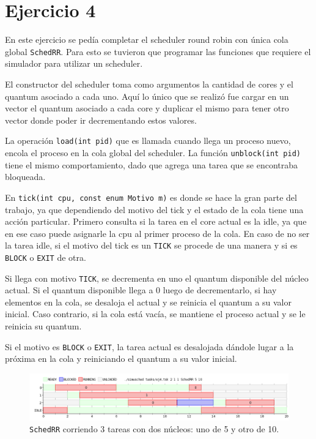 \section{Ejercicio 4}

En este ejercicio se pedía completar el scheduler round robin con única cola
global \texttt{SchedRR}. Para esto se tuvieron que programar las funciones que
requiere el simulador para utilizar un scheduler.

El constructor del scheduler toma como argumentos la cantidad de cores y el
quantum asociado a cada uno. Aquí lo único que se realizó fue cargar en un
vector el quantum asociado a cada core y duplicar el mismo para tener otro
vector donde poder ir decrementando estos valores.

La operación \texttt{load(int pid)} que es llamada cuando llega un proceso
nuevo, encola el proceso en la cola global del scheduler. La función
\texttt{unblock(int pid)} tiene el mismo comportamiento, dado que agrega una
tarea que se encontraba bloqueada.

En \texttt{tick(int cpu, const enum Motivo m)} es donde se hace la gran parte
del trabajo, ya que dependiendo del motivo del tick y el estado de la cola tiene una acción
particular. Primero consulta si la tarea en el core actual es la idle, ya que
en ese caso puede asignarle la cpu al primer proceso de la cola. En caso de no
ser la tarea idle, si el motivo del tick es un \texttt{TICK} se procede de una
manera y si es \texttt{BLOCK} o \texttt{EXIT} de otra.

Si llega con motivo \texttt{TICK}, se decrementa en uno el quantum disponible
del núcleo actual. Si el quantum disponible llega a 0 luego de decrementarlo, si
hay elementos en la cola, se desaloja el actual y se reinicia el quantum a su
valor inicial. Caso contrario, si la cola está vacía, se mantiene el proceso
actual y se le reinicia su quantum.

Si el motivo es \texttt{BLOCK} o \texttt{EXIT}, la tarea actual es desalojada
dándole lugar a la próxima en la cola y reiniciando el quantum a su valor
inicial.

\begin{figure}[ht]
	\begin{center}
		\includegraphics[width=1\columnwidth]{imagenes/ej4.png}
		\caption{\texttt{SchedRR} corriendo 3 tareas con dos núcleos: uno de 5 y
		otro de 10.}
	\end{center}
\end{figure}
